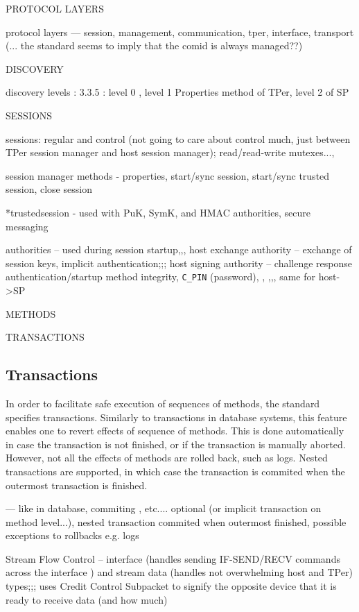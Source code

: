 \documentclass[
  digital, %
  oneside, %
  nolof,     %
  nolot,     %
]{fithesis4}
\begin{document}
PROTOCOL LAYERS

protocol layers --- session, management, communication, tper, interface, transport
(... the standard seems to imply that the comid is always managed??)

DISCOVERY

discovery levels : 3.3.5 : level 0 , level 1 Properties method of TPer, level 2 of SP

SESSIONS

sessions: regular and control (not going to care about control much, just between TPer session manager and host session manager); read/read-write mutexes..., 

session manager methods - properties, start/sync session, start/sync trusted session, close session

*trustedsession - used with PuK, SymK, and HMAC authorities, secure messaging

authorities -- used during session startup,,, host exchange authority -- exchange of session keys, implicit authentication;;; host signing authority -- challenge response authentication/startup method integrity, \verb|C_PIN| (password), , ,,, same for host->SP

METHODS

TRANSACTIONS 

\hline

\subsection{Transactions}

In order to facilitate safe execution of sequences of methods, the standard specifies transactions. Similarly to transactions in database systems, this feature enables one to revert effects of sequence of methods. This is done automatically in case the transaction is not finished, or if the transaction is manually aborted. However, not all the effects of methods are rolled back, such as logs. Nested transactions are supported, in which case the transaction is commited when the outermost transaction is finished.

\hline

--- like in database, commiting , etc.... optional (or implicit transaction on method level...), nested transaction commited when outermost finished, possible exceptions to rollbacks e.g. logs

Stream Flow Control -- interface (handles  sending IF-SEND/RECV commands across the interface ) and stream data (handles not overwhelming host and TPer) types;;; uses Credit Control Subpacket to signify the opposite device that it is ready to receive data (and how much)
\end{document}
